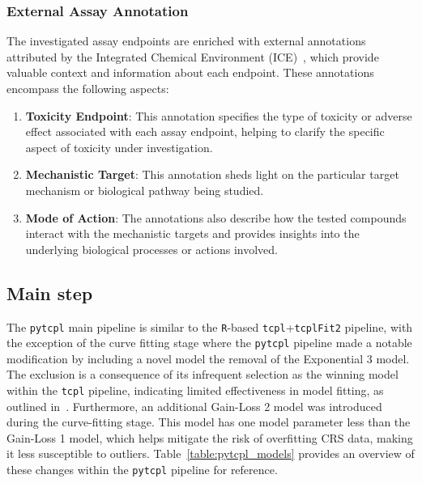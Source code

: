 \subsubsection{External Assay Annotation}
The investigated assay endpoints are enriched with external annotations attributed by the Integrated Chemical Environment (ICE)~\cite{ice2022}, which provide valuable context and information about each endpoint. These annotations encompass the following aspects:

\begin{enumerate}
    \item \textbf{Toxicity Endpoint}: This annotation specifies the type of toxicity or adverse effect associated with each assay endpoint, helping to clarify the specific aspect of toxicity under investigation.
    
    \item \textbf{Mechanistic Target}: This annotation sheds light on the particular target mechanism or biological pathway being studied.
    
    \item \textbf{Mode of Action}: The annotations also describe how the tested compounds interact with the mechanistic targets and provides insights into the underlying biological processes or actions involved.
\end{enumerate}

\subsection{Main step}
The \texttt{pytcpl} main pipeline is similar to the \texttt{R}-based \texttt{tcpl}+\texttt{tcplFit2} pipeline, with the exception of the curve fitting stage where the \texttt{pytcpl} pipeline made a notable modification by including a novel model the removal of the Exponential 3 model. The exclusion is a consequence of its infrequent selection as the winning model within the \texttt{tcpl} pipeline, indicating limited effectiveness in model fitting, as outlined in~\cite{feshuk2023}. Furthermore, an additional Gain-Loss 2 model was introduced during the curve-fitting stage. This model has one model parameter less than the Gain-Loss 1 model, which helps mitigate the risk of overfitting CRS data, making it less susceptible to outliers. Table~\ref{table:pytcpl_models} provides an overview of these changes within the \texttt{pytcpl} pipeline for reference.

